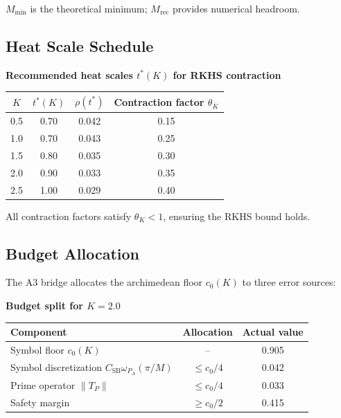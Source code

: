 \noindent $M_{\min}$ is the theoretical minimum; $M_{\mathrm{rec}}$ provides numerical headroom.

\subsection{Heat Scale Schedule}

\begin{center}
\textbf{Recommended heat scales $t^*(K)$ for RKHS contraction}
\end{center}

\begin{center}
\begin{tabular}{cccc}
\toprule
$K$ & $t^*(K)$ & $\rho(t^*)$ & Contraction factor $\theta_K$ \\
\midrule
0.5 & 0.70 & 0.042 & 0.15 \\
1.0 & 0.70 & 0.043 & 0.25 \\
1.5 & 0.80 & 0.035 & 0.30 \\
2.0 & 0.90 & 0.033 & 0.35 \\
2.5 & 1.00 & 0.029 & 0.40 \\
\bottomrule
\end{tabular}
\end{center}

\noindent All contraction factors satisfy $\theta_K < 1$, ensuring the RKHS bound holds.

\subsection{Budget Allocation}

The A3 bridge allocates the archimedean floor $c_0(K)$ to three error sources:

\begin{center}
\textbf{Budget split for $K = 2.0$}
\end{center}

\begin{center}
\begin{tabular}{lcc}
\toprule
\textbf{Component} & \textbf{Allocation} & \textbf{Actual value} \\
\midrule
Symbol floor $c_0(K)$ & -- & 0.905 \\
Symbol discretization $C_{\mathrm{SB}} \omega_{P_A}(\pi/M)$ & $\leq c_0/4$ & 0.042 \\
Prime operator $\|T_P\|$ & $\leq c_0/4$ & 0.033 \\
Safety margin & $\geq c_0/2$ & 0.415 \\
\bottomrule
\end{tabular}
\end{center}

